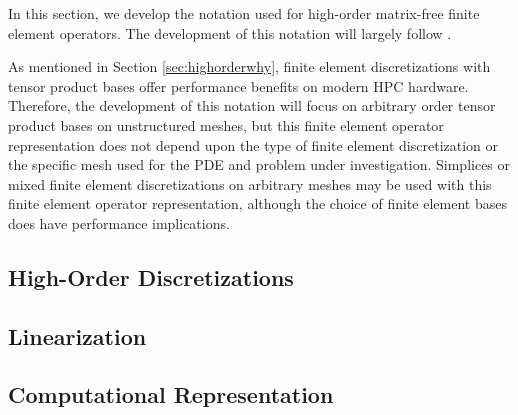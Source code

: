 In this section, we develop the notation used for high-order matrix-free finite element operators.
The development of this notation will largely follow \cite{brown2010efficient}.

As mentioned in Section \ref{sec:highorderwhy}, finite element discretizations with tensor product bases offer performance benefits on modern HPC hardware.
Therefore, the development of this notation will focus on arbitrary order tensor product bases on unstructured meshes, but this finite element operator representation does not depend upon the type of finite element discretization or the specific mesh used for the PDE and problem under investigation.
Simplices or mixed finite element discretizations on arbitrary meshes may be used with this finite element operator representation, although the choice of finite element bases does have performance implications.

\subsection{High-Order Discretizations} \label{sec:highorderdiscretizations}


\subsection{Linearization}


\subsection{Computational Representation}
